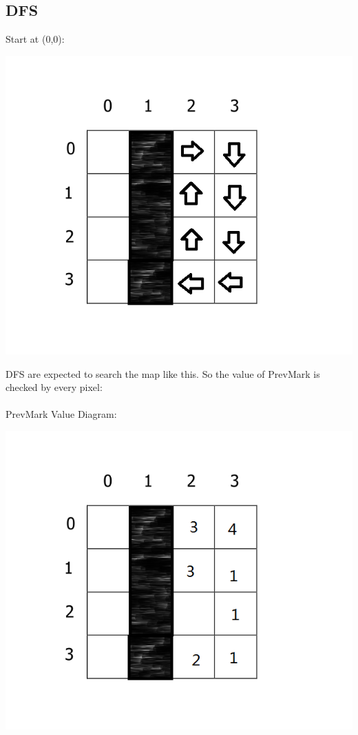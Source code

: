 \documentclass[11pt, a4paper]{report}
\begin{document}
\subsection{DFS}
Start at (0,0):
\begin{center}
\includegraphics[scale=0.4]{./image/Test5DFS.png}
\end{center}
DFS are expected to search the map like this. So the value of PrevMark is checked by every pixel:\\

\paragraph{}PrevMark Value Diagram:
\begin{center}
\includegraphics[scale=0.4]{./image/Test5DFSP.png}
\end{center}
\end{document}
